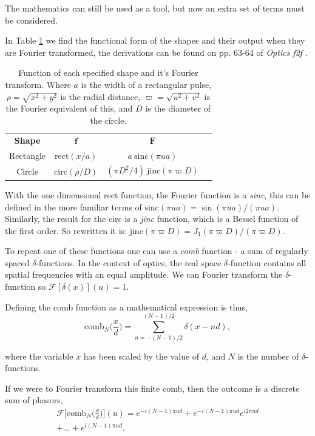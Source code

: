 \documentclass[twocolumn]{revtex4}
\begin{document}
The mathematics can still be used as a tool, but now an extra set of terms must be considered.

In Table \ref{fshapes} we find the functional form of the shapes and their output when they are Fourier transformed, the derivations can be found on pp. 63-64 of \textit{Optics f2f} \cite{of2f}. 
\begin{table}[h!]
\centering
\begin{tabular}{c@{\hskip 20pt}c@{\hskip 20pt}c@{\hskip 10pt}c} 
 \hline
 \textbf{Shape} 	& \textbf{$\boldsymbol{f}$} 		& \textbf{$\boldsymbol{F}$} \\ [1ex] 
 Rectangle 	& $\text{rect}(x/a)$ 				& $a\: \text{sinc}(\pi ua)$ \\ 
 Circle 		& $\text{circ}(\rho/D)$ 			& $(\pi D^2/4)\: \text{jinc}(\pi \varpi D)$ \\
 \hline
\end{tabular}
\caption{Function of each specified shape and it's Fourier transform. Where $a$ is the width of a rectangular pulse, $\rho=\sqrt{x^2+y^2}$ is the radial distance, $\varpi=\sqrt{u^2+v^2}$ is the Fourier equivalent of this, and $D$ is the diameter of the circle.}
\label{fshapes}
\end{table}
\setlength{\belowcaptionskip}{-10pt}

With the one dimensional rect function, the Fourier function is a \textit{sinc}, this can be defined in the more familiar terms of $\text{sinc}(\pi ua)=\sin (\pi ua)/(\pi ua)$. Similarly, the result for the circ is a \textit{jinc} function, which is a Bessel function of the first order. So rewritten it is: $\text{jinc}(\pi \varpi D)=J_1 (\pi \varpi D)/(\pi \varpi D)$.

To repeat one of these functions one can use a \textit{comb} function - a sum of regularly spaced $\delta$-functions. In the context of optics, the real space $\delta$-function contains all spatial frequencies with an equal amplitude. We can Fourier transform the $\delta$-function so $\mathcal{F}[\delta(x)](u)=1$.

Defining the comb function as a mathematical expression is thus,
\begin{equation}
\text{comb}_N \Big(\frac{x}{d}\Big) = \sum_{n=-(N-1)/2}^{(N-1)/2} \delta(x-nd),
\end{equation}

where the variable $x$ has been scaled by the value of $d$, and $N$ is the number of $\delta$-functions.

If we were to Fourier transform this finite comb, then the outcome is a discrete sum of phasors, 
\begin{multline}
\mathcal{F}\Big[\text{comb}_N\Big(\frac{x}{d}\Big)\Big](u)=e^{-i(N-1)\pi ud} + e^{-i(N-1)\pi ud}e^{i2\pi ud}\\+...+e^{i(N-1)\pi ud}.
\end{multline}
\end{document}
